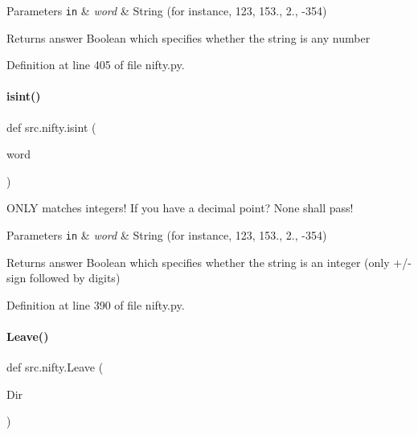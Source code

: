 \begin{DoxyParams}[1]{Parameters}
\mbox{\tt in}  & {\em word} & String (for instance, \textquotesingle{}123\textquotesingle{}, \textquotesingle{}153.\textquotesingle{}, \textquotesingle{}2.\textquotesingle{}, \textquotesingle{}-\/354\textquotesingle{}) \\
\hline
\end{DoxyParams}
\begin{DoxyReturn}{Returns}
answer Boolean which specifies whether the string is any number 
\end{DoxyReturn}


Definition at line 405 of file nifty.\+py.

\mbox{\label{namespacesrc_1_1nifty_a594046f5f131f78ae33a5930144f002b}} 
\paragraph{\texorpdfstring{isint()}{isint()}}
{\footnotesize\ttfamily def src.\+nifty.\+isint (\begin{DoxyParamCaption}\item[{}]{word }\end{DoxyParamCaption})}



O\+N\+LY matches integers! If you have a decimal point? None shall pass! 


\begin{DoxyParams}[1]{Parameters}
\mbox{\tt in}  & {\em word} & String (for instance, \textquotesingle{}123\textquotesingle{}, \textquotesingle{}153.\textquotesingle{}, \textquotesingle{}2.\textquotesingle{}, \textquotesingle{}-\/354\textquotesingle{}) \\
\hline
\end{DoxyParams}
\begin{DoxyReturn}{Returns}
answer Boolean which specifies whether the string is an integer (only +/-\/ sign followed by digits) 
\end{DoxyReturn}


Definition at line 390 of file nifty.\+py.

\mbox{\label{namespacesrc_1_1nifty_adef15c0f6efffef55b8c8212d5722d78}} 
\paragraph{\texorpdfstring{Leave()}{Leave()}}
{\footnotesize\ttfamily def src.\+nifty.\+Leave (\begin{DoxyParamCaption}\item[{}]{Dir }\end{DoxyParamCaption})}



